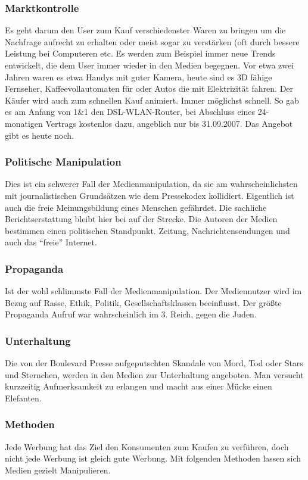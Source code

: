 \subsubsection{Marktkontrolle}
Es geht darum den User zum Kauf verschiedenster Waren zu bringen um die Nachfrage aufrecht zu
erhalten oder meist sogar zu verstärken (oft durch bessere Leistung bei Computeren etc.
Es werden zum Beispiel immer neue Trends entwickelt, die dem User immer wieder in den  Medien
begegnen. Vor etwa zwei Jahren waren es etwa Handys mit guter Kamera, heute sind es 3D fähige
Fernseher, Kaffeevollautomaten für  oder Autos die mit Elektrizität fahren.
Der Käufer wird auch zum schnellen Kauf animiert. Immer möglichst schnell. So gab es am Anfang von
1\&1 den DSL-WLAN-Router, bei Abschluss eines 24-monatigen Vertrags kostenlos dazu, angeblich nur bis
31.09.2007. Das Angebot gibt es heute noch.

\subsubsection{Politische Manipulation}
Dies ist ein schwerer Fall der Medienmanipulation, da sie am wahrscheinlichsten mit journalistischen
Grundsätzen wie \zB dem Pressekodex kollidiert. Eigentlich ist auch die freie Meinungsbildung eines
Menschen gefährdet. Die sachliche Berichtserstattung bleibt hier bei auf der Strecke. Die Autoren der
Medien bestimmen einen politischen Standpunkt. Zeitung, Nachrichtensendungen und auch das \enquote{freie}
Internet.

\subsubsection{Propaganda}
Ist der wohl schlimmste Fall der Medienmanipulation. Der Mediennutzer wird im Bezug auf Rasse, Ethik,
Politik, Gesellschaftsklassen beeinflusst. Der größte Propaganda Aufruf war wahrscheinlich im 3.
Reich, gegen die Juden.

\subsubsection{Unterhaltung}
Die von der Boulevard Presse aufgeputschten Skandale von Mord, Tod oder Stars und Sternchen, werden
in den Medien zur Unterhaltung angeboten. Man versucht kurzzeitig Aufmerksamkeit zu erlangen und
macht aus einer Mücke einen Elefanten.

\subsubsection{Methoden}
Jede Werbung hat das Ziel den Konsumenten zum Kaufen zu verführen, doch nicht jede Werbung ist gleich
gute Werbung. Mit folgenden Methoden lassen sich Medien gezielt Manipulieren.

